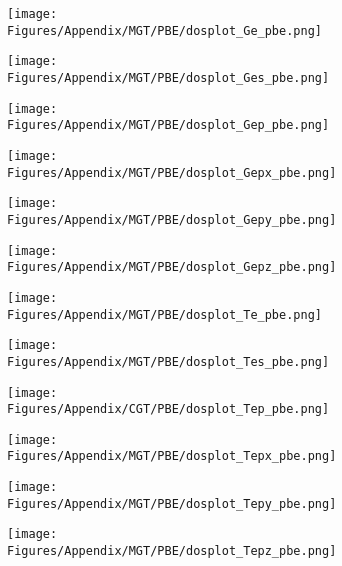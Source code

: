 \begin{figure}[H]
\begin{subfigure}{0.24\textwidth}
    \label{dosplot_Mneg_pbe}
\end{subfigure}
\hfill
\begin{subfigure}{0.24\textwidth}
    \texttt{[image: Figures/Appendix/MGT/PBE/dosplot\_Ge\_pbe.png]}
    \label{dosplot_MnGe_pbe}
\end{subfigure}
\hfill
\begin{subfigure}{0.24\textwidth}
    \texttt{[image: Figures/Appendix/MGT/PBE/dosplot\_Ges\_pbe.png]}
    \label{dosplot_MnGes_pbe}
\end{subfigure}
\hfill
\begin{subfigure}{0.24\textwidth}
    \texttt{[image: Figures/Appendix/MGT/PBE/dosplot\_Gep\_pbe.png]}
    \label{dosplot_MnGep_pbe}
\end{subfigure}
\hfill
\begin{subfigure}{0.24\textwidth}
    \texttt{[image: Figures/Appendix/MGT/PBE/dosplot\_Gepx\_pbe.png]}
    \label{dosplot_MnGepx_pbe}
\end{subfigure}
\hfill
\begin{subfigure}{0.24\textwidth}
    \texttt{[image: Figures/Appendix/MGT/PBE/dosplot\_Gepy\_pbe.png]}
    \label{dosplot_MnGepy_pbe}
\end{subfigure}
\hfill
\begin{subfigure}{0.24\textwidth}
    \texttt{[image: Figures/Appendix/MGT/PBE/dosplot\_Gepz\_pbe.png]}
    \label{dosplot_MnGepz_pbe}
\end{subfigure}
\hfill
\begin{subfigure}{0.24\textwidth}
    \texttt{[image: Figures/Appendix/MGT/PBE/dosplot\_Te\_pbe.png]}
    \label{dosplot_MnTe_pbe}
\end{subfigure}
\hfill
\begin{subfigure}{0.24\textwidth}
    \texttt{[image: Figures/Appendix/MGT/PBE/dosplot\_Tes\_pbe.png]}
    \label{dosplot_MnTes_pbe}
\end{subfigure}
\hfill
\begin{subfigure}{0.24\textwidth}
    \texttt{[image: Figures/Appendix/CGT/PBE/dosplot\_Tep\_pbe.png]}
    \label{dosplot_MnTep_pbe}
\end{subfigure}
\hfill
\begin{subfigure}{0.24\textwidth}
    \texttt{[image: Figures/Appendix/MGT/PBE/dosplot\_Tepx\_pbe.png]}
    \label{dosplot_MnTepx_pbe}
\end{subfigure}
\hfill
\begin{subfigure}{0.24\textwidth}
    \texttt{[image: Figures/Appendix/MGT/PBE/dosplot\_Tepy\_pbe.png]}
    \label{dosplot_MnTepy_pbe}
\end{subfigure}
\begin{subfigure}{0.24\textwidth}
    \texttt{[image: Figures/Appendix/MGT/PBE/dosplot\_Tepz\_pbe.png]}
    \label{dosplot_MnTepz_pbe}
\end{subfigure}
\hfill


\end{figure}
